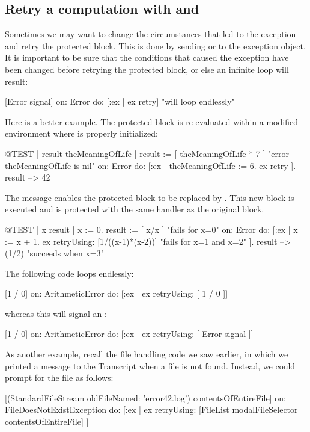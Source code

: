 \documentclass[a4paper,10pt,twoside]{book}
\begin{document}
\subsection{Retry a computation with  and }

Sometimes we may want to change the circumstances that led to the exception and retry the protected block. This is done by sending  or  to the exception object. It is important to be sure that the conditions that caused the exception have been changed before retrying the protected block, or else an infinite  loop will result:
\begin{code}{}
[Error signal] on: Error do: [:ex | ex retry]    "will loop endlessly"
\end{code}

Here is a better example.
The protected block is re-evaluated within a modified environment where  is properly initialized:
\begin{code}{@TEST | result theMeaningOfLife |}
result := [ theMeaningOfLife * 7 ]    "error -- theMeaningOfLife is nil"
	on: Error
	do: [:ex | theMeaningOfLife := 6. ex retry ].
result --> 42
\end{code}

The message  enables the protected block to be replaced by . This new block is executed and is protected with the same handler as the original block.

\begin{code}{@TEST | x result |}
x := 0.
result := [ x/x ]    "fails for x=0"
	on: Error
	do: [:ex |
		x := x + 1.
		ex retryUsing: [1/((x-1)*(x-2))]    "fails for x=1 and x=2"
	].
result --> (1/2)    "succeeds when x=3"
\end{code}

The following code loops endlessly:
\begin{code}{}
[1 / 0] on: ArithmeticError do: [:ex | ex retryUsing: [ 1 / 0 ]]
\end{code}
whereas this will signal an : 
\begin{code}{}
[1 / 0] on: ArithmeticError do: [:ex | ex retryUsing: [ Error signal ]]
\end{code}

As another example, recall the file handling code we saw earlier, in which we printed a message to the Transcript when a file is not found. Instead, we could prompt for the file as follows:
\begin{code}{}
[(StandardFileStream oldFileNamed: 'error42.log') contentsOfEntireFile]
	on: FileDoesNotExistException
	do: [:ex | ex retryUsing: [FileList modalFileSelector contentsOfEntireFile] ]
\end{code}
\end{document}

